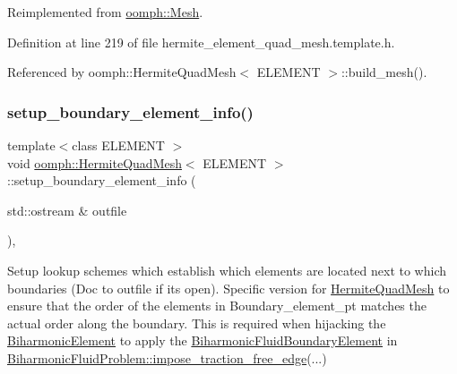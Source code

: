 Reimplemented from \hyperlink{classoomph_1_1Mesh_a6cc8bcd6b41209f0e9295cc993d9c6bb}{oomph\+::\+Mesh}.



Definition at line 219 of file hermite\+\_\+element\+\_\+quad\+\_\+mesh.\+template.\+h.



Referenced by oomph\+::\+Hermite\+Quad\+Mesh$<$ E\+L\+E\+M\+E\+N\+T $>$\+::build\+\_\+mesh().

\mbox{\label{classoomph_1_1HermiteQuadMesh_a0e4cd3df0828e87a762c61b09121e1c0}} 
\subsubsection{\texorpdfstring{setup\+\_\+boundary\+\_\+element\+\_\+info()}{setup\_boundary\_element\_info()}\hspace{0.1cm}{\footnotesize\ttfamily [2/2]}}
{\footnotesize\ttfamily template$<$class E\+L\+E\+M\+E\+NT $>$ \\
void \hyperlink{classoomph_1_1HermiteQuadMesh}{oomph\+::\+Hermite\+Quad\+Mesh}$<$ E\+L\+E\+M\+E\+NT $>$\+::setup\+\_\+boundary\+\_\+element\+\_\+info (\begin{DoxyParamCaption}\item[{std\+::ostream \&}]{outfile }\end{DoxyParamCaption})\hspace{0.3cm}{\ttfamily [private]}, {\ttfamily [virtual]}}



Setup lookup schemes which establish which elements are located next to which boundaries (Doc to outfile if it\textquotesingle{}s open). Specific version for \hyperlink{classoomph_1_1HermiteQuadMesh}{Hermite\+Quad\+Mesh} to ensure that the order of the elements in Boundary\+\_\+element\+\_\+pt matches the actual order along the boundary. This is required when hijacking the \hyperlink{classoomph_1_1BiharmonicElement}{Biharmonic\+Element} to apply the \hyperlink{classoomph_1_1BiharmonicFluidBoundaryElement}{Biharmonic\+Fluid\+Boundary\+Element} in \hyperlink{classoomph_1_1BiharmonicFluidProblem_a1cc57555bbd0ceef1d93010c133ac597}{Biharmonic\+Fluid\+Problem\+::impose\+\_\+traction\+\_\+free\+\_\+edge}(...) 



